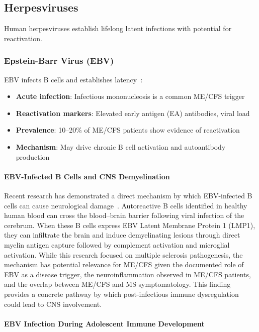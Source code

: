 \subsection{Herpesviruses}
\label{sec:herpesviruses}

Human herpesviruses establish lifelong latent infections with potential for reactivation.

\subsubsection{Epstein-Barr Virus (EBV)}

EBV infects B cells and establishes latency~\cite{ScanJImmunol2025EBV}:
\begin{itemize}
    \item \textbf{Acute infection}: Infectious mononucleosis is a common ME/CFS trigger~\cite{FrontImmunol2024EBV}
    \item \textbf{Reactivation markers}: Elevated early antigen (EA) antibodies, viral load
    \item \textbf{Prevalence}: 10--20\% of ME/CFS patients show evidence of reactivation~\cite{EatonFitch2019}
    \item \textbf{Mechanism}: May drive chronic B cell activation and autoantibody production~\cite{walitt2024deep}
\end{itemize}

\paragraph{EBV-Infected B Cells and CNS Demyelination}
Recent research has demonstrated a direct mechanism by which EBV-infected B cells can cause neurological damage~\cite{Pless2026ebv_demyelination}. Autoreactive B cells identified in healthy human blood can cross the blood--brain barrier following viral infection of the cerebrum. When these B cells express EBV Latent Membrane Protein 1 (LMP1), they can infiltrate the brain and induce demyelinating lesions through direct myelin antigen capture followed by complement activation and microglial activation. While this research focused on multiple sclerosis pathogenesis, the mechanism has potential relevance for ME/CFS given the documented role of EBV as a disease trigger, the neuroinflammation observed in ME/CFS patients, and the overlap between ME/CFS and MS symptomatology. This finding provides a concrete pathway by which post-infectious immune dysregulation could lead to CNS involvement.

\paragraph{EBV Infection During Adolescent Immune Development}

